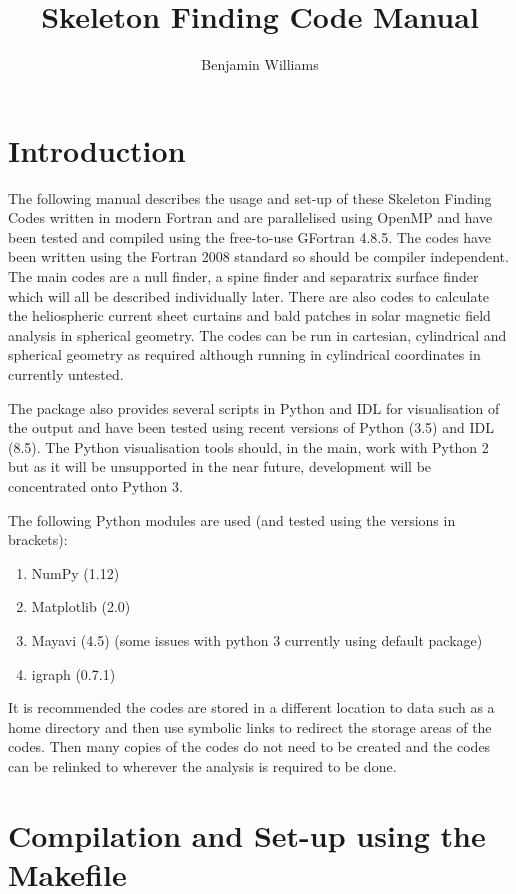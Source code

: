 \documentclass[12pt]{article}
\author{Benjamin Williams}
\title{Skeleton Finding Code Manual}
\begin{document}
  \maketitle

  \section{Introduction}

    The following manual describes the usage and set-up of these Skeleton Finding Codes written in modern Fortran and are parallelised using OpenMP and have been tested and compiled using the free-to-use GFortran 4.8.5. The codes have been written using the Fortran 2008 standard so should be compiler independent. The main codes are a null finder, a spine finder and separatrix surface finder which will all be described individually later. There are also codes to calculate the heliospheric current sheet curtains and bald patches in solar magnetic field analysis in spherical geometry. The codes can be run in cartesian, cylindrical and spherical geometry as required although running in cylindrical coordinates in currently untested.
    
    The package also provides several scripts in Python and IDL for visualisation of the output and have been tested using recent versions of Python (3.5) and IDL (8.5). The Python visualisation tools should, in the main, work with Python 2 but as it will be unsupported in the near future, development will be concentrated onto Python 3.

    The following Python modules are used (and tested using the versions in brackets):
    \begin{enumerate}
      \item NumPy (1.12)
      \item Matplotlib (2.0)
      \item Mayavi (4.5) (some issues with python 3 currently using default package)
      \item igraph (0.7.1)
    \end{enumerate}
    
    It is recommended the codes are stored in a different location to data such as a home directory and then use symbolic links to redirect the storage areas of the codes. Then many copies of the codes do not need to be created and the codes can be relinked to wherever the analysis is required to be done. 

    \section{Compilation and Set-up using the Makefile}
\end{document}
